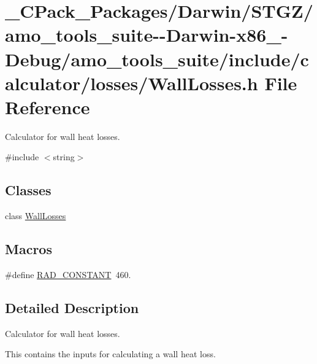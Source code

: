 \hypertarget{___c_pack___packages_2_darwin_2_s_t_g_z_2amo__tools__suite--_darwin-x86__64-_debug_2amo__tools__72cbdaf3bb3033fbed78fcaa88f15f6f}{}\section{\+\_\+\+C\+Pack\+\_\+\+Packages/\+Darwin/\+S\+T\+G\+Z/amo\+\_\+tools\+\_\+suite-\/-\/\+Darwin-\/x86\+\_-\/\+Debug/amo\+\_\+tools\+\_\+suite/include/calculator/losses/\+Wall\+Losses.h File Reference}
\label{___c_pack___packages_2_darwin_2_s_t_g_z_2amo__tools__suite--_darwin-x86__64-_debug_2amo__tools__72cbdaf3bb3033fbed78fcaa88f15f6f}


Calculator for wall heat losses.  


{\ttfamily \#include $<$string$>$}\newline
\subsection*{Classes}
\begin{DoxyCompactItemize}
\item 
class \hyperlink{class_wall_losses}{Wall\+Losses}
\end{DoxyCompactItemize}
\subsection*{Macros}
\begin{DoxyCompactItemize}
\item 
\#define \hyperlink{___c_pack___packages_2_darwin_2_s_t_g_z_2amo__tools__suite--_darwin-x86__64-_debug_2amo__tools__72cbdaf3bb3033fbed78fcaa88f15f6f_ae9989856134afe2803a2e4c1e56dc7b8}{R\+A\+D\+\_\+\+C\+O\+N\+S\+T\+A\+NT}~460.
\end{DoxyCompactItemize}


\subsection{Detailed Description}
Calculator for wall heat losses. 

This contains the inputs for calculating a wall heat loss.

